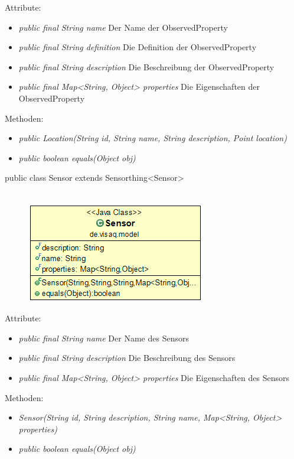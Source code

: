Attribute:
\begin{itemize} 
	\item \emph{public final String name} Der Name der ObservedProperty
	\item \emph{public final String definition} Die Definition der ObservedProperty
	\item \emph{public final String description} Die Beschreibung der ObservedProperty
	\item \emph{public final Map<String, Object> properties} Die Eigenschaften der ObservedProperty
\end{itemize}
Methoden:
\begin{itemize} 
	\item \emph{public Location(String id, String name, String description, Point location)} 
	\item \emph{public boolean equals(Object obj)} 
\end{itemize}


public class Sensor extends Sensorthing<Sensor>
\\\\
\begin{minipage}{0.3\textwidth}
	\begin{figure}[H]
		\includegraphics[scale = 0.5
		]{media/frontend/model/SensorClass.png}
	\end{figure}
\end{minipage} \hfill
\begin{minipage}{0.6\textwidth}
\end{minipage}

Attribute:
\begin{itemize} 
	\item \emph{public final String name} Der Name des Sensors
	\item \emph{public final String description} Die Beschreibung des Sensors
	\item \emph{public final Map<String, Object> properties} Die Eigenschaften des Sensors
\end{itemize}
Methoden:
\begin{itemize} 
	\item \emph{Sensor(String id, String description, String name, Map<String, Object> properties)} 
	\item \emph{public boolean equals(Object obj)} 
\end{itemize}

